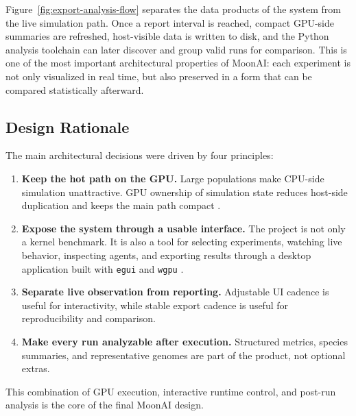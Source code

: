 Figure~\ref{fig:export-analysis-flow} separates the data products of the system from the live
simulation path. Once a report interval is reached, compact GPU-side summaries are refreshed,
host-visible data is written to disk, and the Python analysis toolchain can later discover and
group valid runs for comparison. This is one of the most important architectural properties of
MoonAI: each experiment is not only visualized in real time, but also preserved in a form that
can be compared statistically afterward.

\subsection{Design Rationale}

The main architectural decisions were driven by four principles:

\begin{enumerate}[nosep]
  \item \textbf{Keep the hot path on the GPU.} Large populations make CPU-side simulation
    unattractive. GPU ownership of simulation state reduces host-side duplication and keeps the
    main path compact \cite{cuda}.
  \item \textbf{Expose the system through a usable interface.} The project is not only a kernel
    benchmark. It is also a tool for selecting experiments, watching live behavior, inspecting
    agents, and exporting results through a desktop application built with \texttt{egui} and
    \texttt{wgpu} \cite{egui,wgpu}.
  \item \textbf{Separate live observation from reporting.} Adjustable UI cadence is useful for
    interactivity, while stable export cadence is useful for reproducibility and comparison.
  \item \textbf{Make every run analyzable after execution.} Structured metrics, species
    summaries, and representative genomes are part of the product, not optional extras.
\end{enumerate}

This combination of GPU execution, interactive runtime control, and post-run analysis is the
core of the final MoonAI design.
